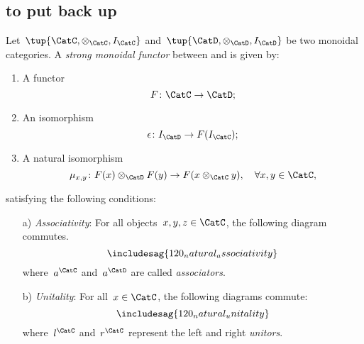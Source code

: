 
\subsection{to put back up}


\begin{ctdefinition}
    Let~$\tup{\CatC,\otimes_\CatC,I_\CatC}$ and~$\tup{\CatD,\otimes_\CatD,I_\CatD}$ be two monoidal categories. A \emph{strong monoidal functor} between \CatC and \CatD is given by:
    \begin{enumerate}
        \item A functor
        \begin{equation}
            F\colon \CatC\to \CatD;
        \end{equation}
        \item An isomorphism
        \begin{equation}
            \epsilon\colon I_\CatD\to F(I_\CatC);
        \end{equation}
        \item A natural isomorphism
        \begin{equation}
            \mu_{x,y}\colon F(x)\otimes_\CatD F(y) \to F(x\otimes_\CatC y),\quad \forall x,y\in \CatC,
        \end{equation}
    \end{enumerate}
    satisfying the following conditions:
    \begin{enumerate}
        \item[a)] \emph{Associativity}: For all objects~$x,y,z\in \CatC$, the following diagram commutes.
        \begin{equation}
            \includesag{120_natural_associativity}
        \end{equation}
        where~$a^\CatC$ and~$a^\CatD$ are called \emph{associators}.
        \item[b)] \emph{Unitality}: For all~$x\in \CatC$, the following diagrams commute:
        \begin{equation}
            \includesag{120_natural_unitality}
        \end{equation}
        where~$l^\CatC$ and~$r^\CatC$ represent the left and right \emph{unitors}.
    \end{enumerate}
\end{ctdefinition}


